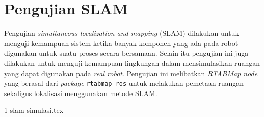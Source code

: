 \section{Pengujian SLAM}
\label{sec:pengujianslam}

Pengujian \emph{simultaneous localization and mapping} (SLAM) dilakukan untuk menguji kemampuan sistem ketika banyak komponen yang ada pada robot digunakan untuk suatu proses secara bersamaan.
Selain itu pengujian ini juga dilakukan untuk menguji kemampuan lingkungan dalam mensimulasikan ruangan yang dapat digunakan pada \emph{real robot}.
Pengujian ini melibatkan \emph{RTABMap node} yang berasal dari \emph{package} \lstinline{rtabmap_ros} \citep{cit:labbe2019} untuk melakukan pemetaan ruangan sekaligus lokalisasi menggunakan metode SLAM.

{1-slam-simulasi.tex}
